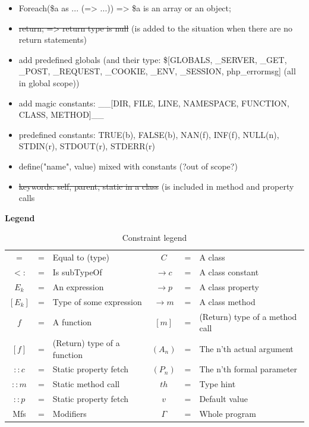 \documentclass[../main.tex]{subfiles}
\begin{document}
\begin{itemize}
        \item Foreach(\$a as ... (=> ...)) => \$a is an array or an object;
        \item \sout{return; => return type is null} (is added to the situation when there are no return statements)
        \item add predefined globals (and their type: \$[GLOBALS, \_SERVER, \_GET, \_POST, \_REQUEST, \_COOKIE, \_ENV, \_SESSION, php\_errormsg] (all in global scope))
        \item add magic constants: \_\_[DIR, FILE, LINE, NAMESPACE, FUNCTION, CLASS, METHOD]\_\_
        \item predefined constants: TRUE(b), FALSE(b), NAN(f), INF(f), NULL(n), STDIN(r), STDOUT(r), STDERR(r) 
        \item define("name", value) mixed with constants (?out of scope?)
        \item \sout{keywords: self, parent, static in a class} (is included in method and property calls        
    \end{itemize}

    \hrulefill
    
    \textbf{Legend} \\
    \begin{table}[H]
        \begin{tabular}{ c c l c c l }
            $=$     & = & Equal to (type) &
            $C$     & = & A class \\
            $<:$    & = & Is subTypeOf &
            $\rightarrow c$     & = & A class constant \\
            $E_k$   & = & An expression &
            $\rightarrow p$     & = & A class property \\
            $[E_k]$ & = & Type of some expression &
            $\rightarrow m$     & = & A class method \\
            $f$     & = & A function &
            $[m]$   & = & (Return) type of a method call \\
            $[f]$   & = & (Return) type of a function &
            $(A_n)$ & = & The n'th actual argument \\
            $::c$   & = & Static property fetch &
            $(P_n)$ & = & The n'th formal parameter \\
            $::m$   & = & Static method call &
            $th$    & = & Type hint \\
            $::p$   & = & Static property fetch &
            $v$     & = & Default value \\
            Mfs     & = & Modifiers &
            $\Gamma$ & = & Whole program 
            
            
        \end{tabular}
        \caption{Constraint legend}
        \label{table:constraintLegend}
    \end{table}
    
\end{document}
